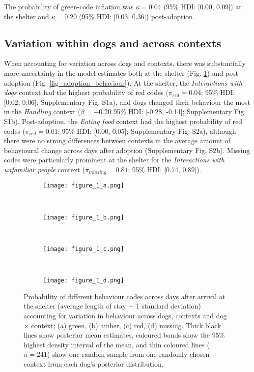 \documentclass[fleqn,10pt]{wlscirep}
\begin{document}
The probability of green-code inflation was $\kappa = 0.04$ (95\% HDI: [0.00, 0.09]) at the shelter and $\kappa = 0.20$ (95\% HDI: [0.03, 0.36]) post-adoption.

\subsection*{Variation within dogs and across contexts}
When accounting for variation across dogs and contexts, there was substantially more uncertainty in the model estimates both at the shelter (Fig. \ref{fig_shelter_behaviour}) and post-adoption (Fig. \ref{fig_adoption_behaviour}). At the shelter, the \textit{Interactions with dogs} context had the highest probability of red codes ($\pi_{red} = 0.04$; 95\% HDI: [0.02, 0.06]; Supplementary Fig. S1a), and dogs changed their behaviour the most in the \textit{Handling} context ($\beta = -0.20$ 95\% HDI: [-0.28, -0.14]; Supplementary Fig. S1b). Post-adoption, the \textit{Eating food}
context had the highest probability of red codes ($\pi_{red} = 0.01$; 95\% HDI: [0.00, 0.05]; Supplementary Fig. S2a), although there were no strong differences between contexts in the average amount of behavioural change across days after adoption (Supplementary Fig. S2b). Missing codes were particularly prominent at the shelter for the \textit{Interactions with unfamiliar people} context ($\pi_{missing} = 0.81$; 95\% HDI: [0.74, 0.89]).


\begin{figure}[t!]
  \hspace{-2cm}%
  \begin{subfigure}{0.4\textwidth}
    \centering
    \texttt{[image: figure\_1\_a.png]}
  \end{subfigure}%
  ~%
  \hspace{-2cm}
  \begin{subfigure}{0.4\textwidth}
    \centering
    \texttt{[image: figure\_1\_b.png]}
  \end{subfigure}%
  ~%
  \hspace{-2cm}
  \begin{subfigure}{0.4\textwidth}
    \centering
    \texttt{[image: figure\_1\_c.png]}
  \end{subfigure}%
  ~%
  \hspace{-2cm}
  \begin{subfigure}{0.4\textwidth}
    \centering
    \texttt{[image: figure\_1\_d.png]}
  \end{subfigure}%

  \caption{Probability of different behaviour codes across days after arrival at the shelter (average length of stay + 1 standard deviation) accounting for variation in behaviour across dogs, contexts and dog $\times$ context; (a) green, (b) amber, (c) red, (d) missing. Thick black lines show posterior mean estimates, coloured bands show the 95\% highest density interval of the mean, and thin coloured lines ($n = 241$) show one random sample from one randomly-chosen context from each dog's posterior distribution.}
  \label{fig_shelter_behaviour}
\end{figure}
\end{document}

